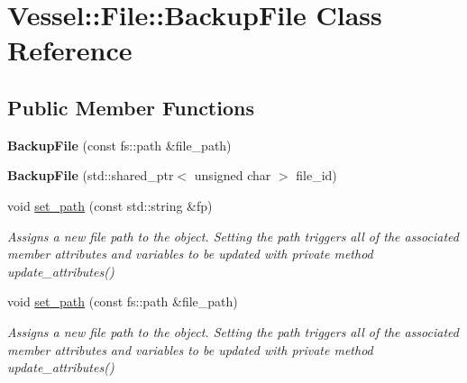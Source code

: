 \hypertarget{class_vessel_1_1_file_1_1_backup_file}{}\section{Vessel\+:\+:File\+:\+:Backup\+File Class Reference}
\label{class_vessel_1_1_file_1_1_backup_file}
\subsection*{Public Member Functions}
\begin{DoxyCompactItemize}
\item 
\mbox{\label{class_vessel_1_1_file_1_1_backup_file_a0c550a745101ab5e79b79d3639442205}} 
{\bfseries Backup\+File} (const fs\+::path \&file\+\_\+path)
\item 
\mbox{\label{class_vessel_1_1_file_1_1_backup_file_ac9b3d29d5104a413073016d377029a03}} 
{\bfseries Backup\+File} (std\+::shared\+\_\+ptr$<$ unsigned char $>$ file\+\_\+id)
\item 
\mbox{\label{class_vessel_1_1_file_1_1_backup_file_a095b34be54d2f67a8eb69ee746e168d9}} 
void \hyperlink{class_vessel_1_1_file_1_1_backup_file_a095b34be54d2f67a8eb69ee746e168d9}{set\+\_\+path} (const std\+::string \&fp)
\begin{DoxyCompactList}\small\item\em Assigns a new file path to the object. Setting the path triggers all of the associated member attributes and variables to be updated with private method update\+\_\+attributes() \end{DoxyCompactList}\item 
\mbox{\label{class_vessel_1_1_file_1_1_backup_file_aeeb8b7494f20413b0114eefe0a4a7c4e}} 
void \hyperlink{class_vessel_1_1_file_1_1_backup_file_aeeb8b7494f20413b0114eefe0a4a7c4e}{set\+\_\+path} (const fs\+::path \&file\+\_\+path)
\begin{DoxyCompactList}\small\item\em Assigns a new file path to the object. Setting the path triggers all of the associated member attributes and variables to be updated with private method update\+\_\+attributes() \end{DoxyCompactList}\item 

\end{DoxyCompactItemize}
